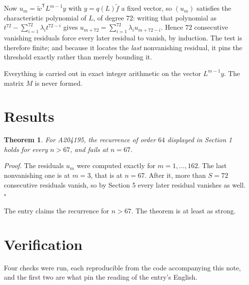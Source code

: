 \documentclass[11pt]{article}
\newtheorem{theorem}{Theorem}
\theoremstyle{definition}
\begin{document}
Now $u_m = \tilde w^{\mathsf T} L^{m-1} y$ with $y = q(L)\tilde f$ a fixed vector, so $(u_m)$ satisfies the characteristic polynomial of $L$, of degree $72$: writing that polynomial as $t^{72} - \sum_{i=1}^{72} \lambda_i t^{72-i}$ gives $u_{m+72} = \sum_{i=1}^{72} \lambda_i u_{m+72-i}$. Hence $72$ consecutive vanishing residuals force every later residual to vanish, by induction. The test is therefore finite; and because it locates the {\itshape last} nonvanishing residual, it pins the threshold exactly rather than merely bounding it.

Everything is carried out in exact integer arithmetic on the vector $L^{m-1}y$. The matrix $M$ is never formed.

\section{Results}

\begin{theorem} For A204195, the recurrence of order $64$ displayed in Section 1 holds for every $n > 67$, and fails at $n = 67$.\end{theorem}

{\itshape Proof.} The residuals $u_m$ were computed exactly for $m = 1,\dots,162$. The last nonvanishing one is at $m = 3$, that is at $n = 67$. After it, more than $S = 72$ consecutive residuals vanish, so by Section 5 every later residual vanishes as well. $\square$

The entry claims the recurrence for $n > 67$. The theorem is at least as strong.

\section{Verification}

Four checks were run, each reproducible from the code accompanying this note, and the first two are what pin the reading of the entry's English.
\end{document}
